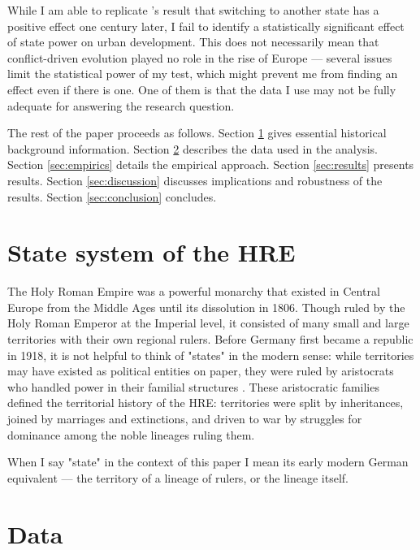 \documentclass[11pt, a4paper]{article}
\begin{document}
While I am able to replicate \cite{schoenholzer2022}'s result that switching to another state has a positive effect one century later, I fail to identify a statistically significant effect of state power on urban development. This does not necessarily mean that conflict-driven evolution played no role in the rise of Europe --- several issues limit the statistical power of my test, which might prevent me from finding an effect even if there is one. One of them is that the data I use may not be fully adequate for answering the research question.

The rest of the paper proceeds as follows. Section \ref{sec:background} gives essential historical background information. Section \ref{sec:data} describes the data used in the analysis. Section \ref{sec:empirics} details the empirical approach. Section \ref{sec:results} presents results. Section \ref{sec:discussion} discusses implications and robustness of the results. Section \ref{sec:conclusion} concludes.



\section{State system of the HRE} \label{sec:background}

The Holy Roman Empire was a powerful monarchy that existed in Central Europe from the Middle Ages until its dissolution in 1806. Though ruled by the Holy Roman Emperor at the Imperial level, it consisted of many small and large territories with their own regional rulers. Before Germany first became a republic in 1918, it is not helpful to think of "states" in the modern sense: while territories may have existed as political entities on paper, they were ruled by aristocrats who handled power in their familial structures \citep[pp. 2-3]{pt2}. These aristocratic families defined the territorial history of the HRE: territories were split by inheritances, joined by marriages and extinctions, and driven to war by struggles for dominance among the noble lineages ruling them. 

When I say "state" in the context of this paper I mean its early modern German equivalent --- the territory of a lineage of rulers, or the lineage itself.


\section{Data} \label{sec:data}
\end{document}
